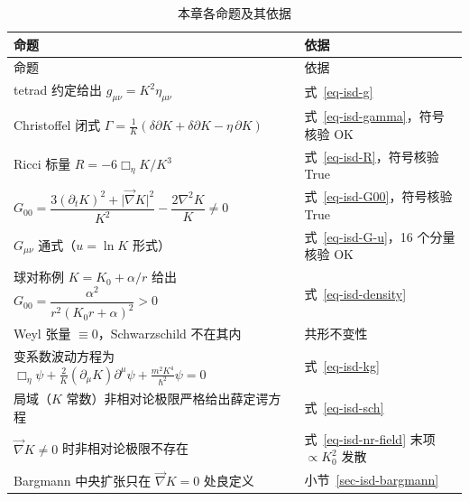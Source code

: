 \documentclass[
  chinese,
  a4paper,
  UTF8,
  12pt,
  oneside,
  openany]{ctexbook}
\theoremstyle{plain}
\theoremstyle{plain}
\theoremstyle{plain}
\theoremstyle{definition}
\theoremstyle{plain}
\theoremstyle{plain}
\theoremstyle{remark}
\begin{document}
\begin{longtable}[]{@{}
  >{\raggedright\arraybackslash}p{}
  >{\raggedright\arraybackslash}p{}@{}}
\caption{本章各命题及其依据}\label{tbl-isd-conclusion}\tabularnewline
\toprule\noalign{}
\begin{minipage}[b]{\linewidth}\raggedright
命题
\end{minipage} & \begin{minipage}[b]{\linewidth}\raggedright
依据
\end{minipage} \\
\midrule\noalign{}
\endfirsthead
\toprule\noalign{}
\begin{minipage}[b]{\linewidth}\raggedright
命题
\end{minipage} & \begin{minipage}[b]{\linewidth}\raggedright
依据
\end{minipage} \\
\midrule\noalign{}
\endhead
\bottomrule\noalign{}
\endlastfoot
tetrad 约定给出 \(g_{\mu\nu}=K^{2}\eta_{\mu\nu}\) & 式~\ref{eq-isd-g} \\
Christoffel 闭式
\(\Gamma=\frac1K(\delta\partial K+\delta\partial K-\eta\,\partial K)\) &
式~\ref{eq-isd-gamma}，符号核验 OK \\
Ricci 标量 \(R=-6\Box_\eta K/K^{3}\) & 式~\ref{eq-isd-R}，符号核验
True \\
\(G_{00}=\dfrac{3(\partial_tK)^{2}+\lvert\vec\nabla K\rvert^{2}}{K^{2}}-\dfrac{2\nabla^{2}K}{K}\neq0\)
& 式~\ref{eq-isd-G00}，符号核验 True \\
\(G_{\mu\nu}\) 通式（\(u=\ln K\) 形式） & 式~\ref{eq-isd-G-u}，16
个分量核验 OK \\
球对称例 \(K=K_0+\alpha/r\) 给出
\(G_{00}=\dfrac{\alpha^{2}}{r^{2}(K_0r+\alpha)^{2}}>0\) &
式~\ref{eq-isd-density} \\
Weyl 张量 \(\equiv0\)，Schwarzschild 不在其内 & 共形不变性 \\
变系数波动方程为
\(\Box_\eta\psi+\frac2K(\partial_{\mu}K)\partial^\mu\psi+\frac{m^2K^4}{\hbar^2}\psi=0\)
& 式~\ref{eq-isd-kg} \\
局域（\(K\) 常数）非相对论极限严格给出薛定谔方程 &
式~\ref{eq-isd-sch} \\
\(\vec\nabla K\neq0\) 时非相对论极限不存在 & 式~\ref{eq-isd-nr-field}
末项 \(\propto K_0^{2}\) 发散 \\
Bargmann 中央扩张只在 \(\vec\nabla K=0\) 处良定义 &
小节~\ref{sec-isd-bargmann} \\
\end{longtable}
\end{document}
